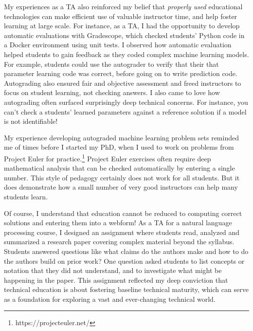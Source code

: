 \documentclass{article}
\begin{document}
My experiences as a TA also reinforced my belief that \textit{properly used} educational technologies can make efficient use of valuable instructor time, and help foster learning at large scale. For instance, as a TA, I had the opportunity to develop automatic evaluations with Gradescope, which checked students' Python code in a Docker environment using unit tests. I observed how automatic evaluation helped students to gain feedback as they coded complex machine learning models. For example, students could use the autograder to verify that their that parameter learning code was correct, before going on to write prediction code. Autograding also ensured fair and objective assessment and freed instructors to focus on student learning, not checking answers. I also came to love how autograding often surfaced surprisingly deep technical concerns. For instance, you can't check a students' learned parameters against a reference solution if a model is not identifiable!

My experience developing autograded machine learning problem sets reminded me of times before I started my PhD, when I used to work on problems from Project Euler for practice.\footnote{https://projecteuler.net/} Project Euler exercises often require deep mathematical analysis that can be checked automatically by entering a single number. This style of pedagogy certainly does not work for all students. But it does demonstrate how a small number of very good instructors can help many students learn. 

Of course, I understand that education cannot be reduced to computing correct solutions and entering them into a webform! As a TA for a  natural language processing course, I designed an assignment where students read, analyzed and summarized a research paper covering complex material beyond the syllabus. Students answered questions like what claims do the authors make and how to do the authors build on prior work? One question asked students to list concepts or notation that they did not understand, and to investigate what might be happening in the paper. This assignment reflected my deep conviction that technical education is about fostering baseline technical maturity, which can serve as a foundation for exploring a vast and ever-changing technical world.

\end{document}
